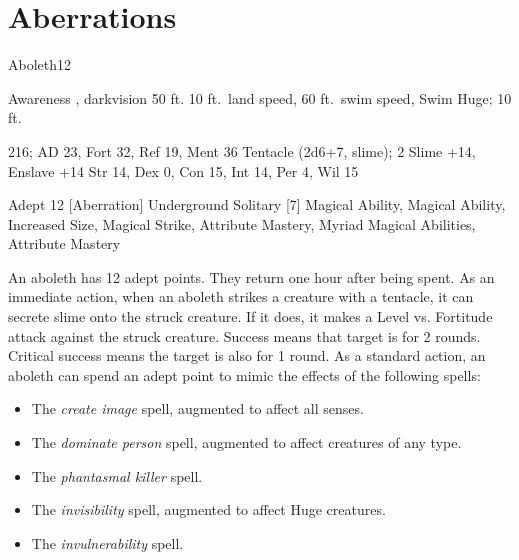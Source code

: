\section{Aberrations}

    \begin{monsection}{Aboleth}{12}
        \begin{spellcontent}
            \begin{spelltargetinginfo}
                \pari {} Awareness , darkvision 50 ft.
                \pari {} 10 ft.\ land speed, 60 ft.\ swim speed, Swim 
                \pari {} Huge;  10 ft.
            \end{spelltargetinginfo}
            \begin{spelleffects}
                \pari {} 216;  AD 23, Fort 32, Ref 19, Ment 36
                \pari {} Tentacle  (2d6+7, slime);  2
                \pari {} Slime +14, Enslave +14
                \pari {} Str 14, Dex 0, Con 15, Int 14, Per 4, Wil 15
            \end{spelleffects}
        \end{spellcontent}
        \begin{spellfooter}
            \pari {} Adept 12 [Aberration]
            \pari {} Underground
            \pari {} Solitary
            \pari {} [7] Magical Ability, Magical Ability, Increased Size, Magical Strike, Attribute Mastery, Myriad Magical Abilities, Attribute Mastery
        \end{spellfooter}
    \end{monsection}
     An aboleth has 12 adept points.
    They return one hour after being spent.
     As an immediate action, when an aboleth strikes a creature with a tentacle, it can secrete slime onto the struck creature.
    If it does, it makes a Level vs. Fortitude attack against the struck creature.
    Success means that target is \sickened for 2 rounds.
    Critical success means the target is also \nauseated for 1 round.
     As a standard action, an aboleth can spend an adept point to mimic the effects of the following spells:
    \begin{itemize}
        \item The \textit{create image} spell, augmented to affect all senses.
        \item The \textit{dominate person} spell, augmented to affect creatures of any type.
        \item The \textit{phantasmal killer} spell.
        \item The \textit{invisibility} spell, augmented to affect Huge creatures.
        \item The \textit{invulnerability} spell.
    \end{itemize}
